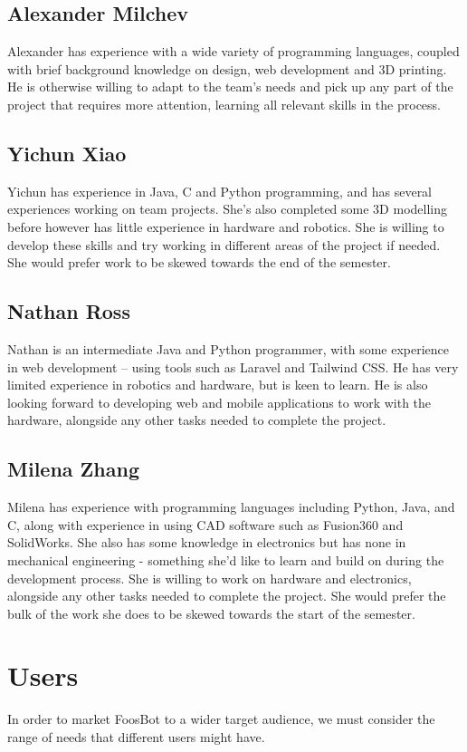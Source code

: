 \documentclass{article}
\begin{document}
\subsection{Alexander Milchev}
Alexander has experience with a wide variety of programming languages, coupled with brief background knowledge on design, web development and 3D printing. He is otherwise willing to adapt to the team's needs and pick up any part of the project that requires more attention, learning all relevant skills in the process.

\subsection{Yichun Xiao}
Yichun has experience in Java, C and Python programming, and has several experiences working on team projects. She's also completed some 3D modelling before however has little experience in hardware and robotics. She is willing to develop these skills and try working in different areas of the project if needed. She would prefer work to be skewed towards the end of the semester.

\subsection{Nathan Ross}
Nathan is an intermediate Java and Python programmer, with some experience in web development – using tools such as Laravel and Tailwind CSS. He has very limited experience in robotics and hardware, but is keen to learn. He is also looking forward to developing web and mobile applications to work with the hardware, alongside any other tasks needed to complete the project. 

\subsection{Milena Zhang}
Milena has experience with programming languages including Python, Java, and C, along with experience in using CAD software such as Fusion360 and SolidWorks. She also has some knowledge in electronics but has none in mechanical engineering - something she'd like to learn and build on during the development process. She is willing to work on hardware and electronics, alongside any other tasks needed to complete the project. She would prefer the bulk of the work she does to be skewed towards the start of the semester.

\section{Users} 
In order to market FoosBot to a wider target audience, we must consider the range of needs that different users might have.
\end{document}
